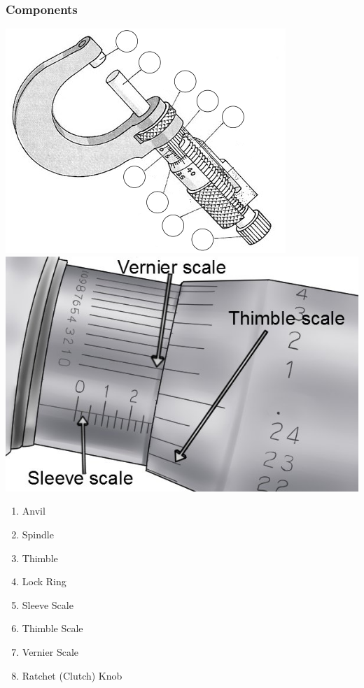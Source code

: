 \documentclass[fleqn]{beamer} %
\newcommand{\sectionIIsubsectionIItitle}{Components}
\begin{document}
			\begin{frame}
				\frametitle{\sectionIIsubsectionIItitle}
				\includegraphics[scale=.35]{images/micrometer_fig2.png}
		        \includegraphics[scale=.25]{images/micrometer_fig1.png}
		        \begin{multicols}{2}
		        	\begin{enumerate}
		 			\item Anvil
		 			\item Spindle
		 			\item Thimble
		 			\item Lock Ring
		 			\item Sleeve Scale
		 			\item Thimble Scale
		 			\item Vernier Scale
		 			\item Ratchet (Clutch) Knob			
		 		\end{enumerate}
		 		\end{multicols}


			\end{frame}
\end{document}
